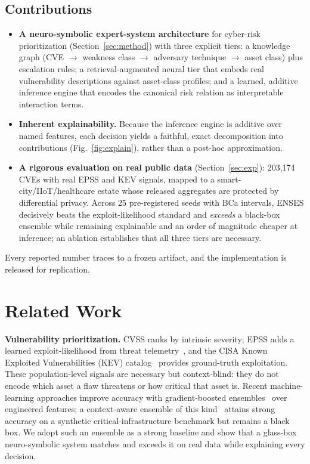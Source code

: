 \documentclass[journal]{IEEEtran}
\begin{document}
\subsection{Contributions}
\label{sec:contrib}
\begin{itemize}
\item \textbf{A neuro-symbolic expert-system architecture} for cyber-risk
prioritization (Section~\ref{sec:method}) with three explicit tiers: a
knowledge graph (CVE $\rightarrow$ weakness class $\rightarrow$ adversary
technique $\rightarrow$ asset class) plus escalation rules; a
retrieval-augmented neural tier that embeds real vulnerability descriptions
against asset-class profiles; and a learned, additive inference engine that
encodes the canonical risk relation as interpretable interaction terms.
\item \textbf{Inherent explainability.} Because the inference engine is additive
over named features, each decision yields a faithful, exact decomposition into
contributions (Fig.~\ref{fig:explain}), rather than a post-hoc approximation.
\item \textbf{A rigorous evaluation on real public data}
(Section~\ref{sec:exp}): 203{,}174 CVEs with real EPSS and KEV signals, mapped
to a smart-city/IIoT/healthcare estate whose released aggregates are protected
by differential privacy. Across 25 pre-registered seeds with BCa intervals,
ENSES decisively beats the exploit-likelihood standard and \emph{exceeds} a
black-box ensemble while remaining explainable and an order of magnitude
cheaper at inference; an ablation establishes that all three tiers are
necessary.
\end{itemize}
Every reported number traces to a frozen artifact, and the implementation is
released for replication.

\section{Related Work}
\label{sec:related}
\textbf{Vulnerability prioritization.} CVSS ranks by intrinsic severity; EPSS
adds a learned exploit-likelihood from threat telemetry~\cite{jacobs2021epss},
and the CISA Known Exploited Vulnerabilities (KEV) catalog~\cite{cisa2021kev}
provides ground-truth exploitation. These population-level signals are
necessary but context-blind: they do not encode which asset a flaw threatens or
how critical that asset is. Recent machine-learning approaches improve accuracy
with gradient-boosted ensembles~\cite{chen2016xgboost} over engineered features;
a context-aware ensemble of this kind~\cite{malla2026ensemble} attains strong
accuracy on a synthetic critical-infrastructure benchmark but remains a black
box. We adopt such an ensemble as a strong baseline and show that a glass-box
neuro-symbolic system matches and exceeds it on real data while explaining every
decision.
\end{document}
